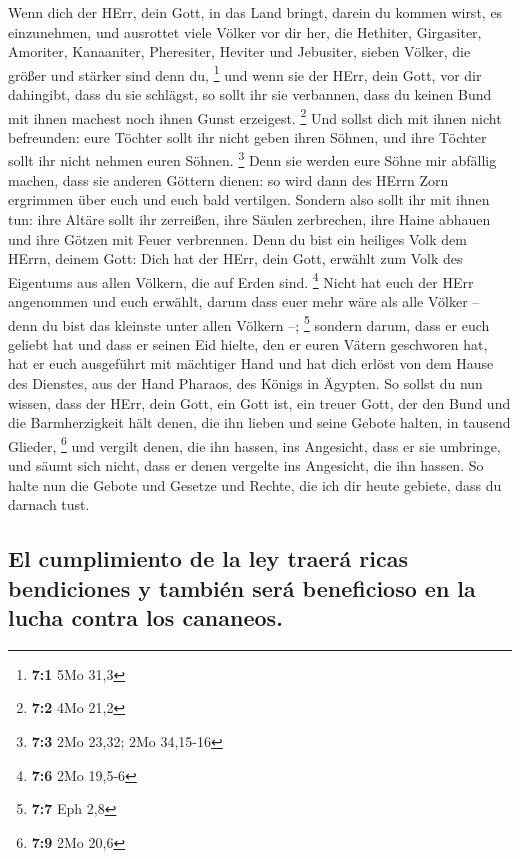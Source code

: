  Wenn dich der HErr, dein Gott, in das Land bringt, darein
du kommen wirst, es einzunehmen, und ausrottet viele Völker vor dir her,
die Hethiter, Girgasiter, Amoriter, Kanaaniter, Pheresiter, Heviter und
Jebusiter, sieben Völker, die größer und stärker sind denn du,
\footnote{\textbf{7:1} 5Mo 31,3}  und wenn sie der HErr,
dein Gott, vor dir dahingibt, dass du sie schlägst, so sollt ihr sie
verbannen, dass du keinen Bund mit ihnen machest noch ihnen Gunst
erzeigest. \footnote{\textbf{7:2} 4Mo 21,2}  Und sollst
dich mit ihnen nicht befreunden: eure Töchter sollt ihr nicht geben
ihren Söhnen, und ihre Töchter sollt ihr nicht nehmen euren Söhnen.
\footnote{\textbf{7:3} 2Mo 23,32; 2Mo 34,15-16}  Denn sie
werden eure Söhne mir abfällig machen, dass sie anderen Göttern dienen:
so wird dann des HErrn Zorn ergrimmen über euch und euch bald vertilgen.
 Sondern also sollt ihr mit ihnen tun: ihre Altäre sollt
ihr zerreißen, ihre Säulen zerbrechen, ihre Haine abhauen und ihre
Götzen mit Feuer verbrennen.  Denn du bist ein heiliges
Volk dem HErrn, deinem Gott: Dich hat der HErr, dein Gott, erwählt zum
Volk des Eigentums aus allen Völkern, die auf Erden sind. \footnote{\textbf{7:6}
  2Mo 19,5-6}  Nicht hat euch der HErr angenommen und euch
erwählt, darum dass euer mehr wäre als alle Völker -- denn du bist das
kleinste unter allen Völkern --; \footnote{\textbf{7:7} Eph 2,8}
 sondern darum, dass er euch geliebt hat und dass er
seinen Eid hielte, den er euren Vätern geschworen hat, hat er euch
ausgeführt mit mächtiger Hand und hat dich erlöst von dem Hause des
Dienstes, aus der Hand Pharaos, des Königs in Ägypten.  So
sollst du nun wissen, dass der HErr, dein Gott, ein Gott ist, ein treuer
Gott, der den Bund und die Barmherzigkeit hält denen, die ihn lieben und
seine Gebote halten, in tausend Glieder, \footnote{\textbf{7:9} 2Mo 20,6}
 und vergilt denen, die ihn hassen, ins Angesicht, dass
er sie umbringe, und säumt sich nicht, dass er denen vergelte ins
Angesicht, die ihn hassen.  So halte nun die Gebote und
Gesetze und Rechte, die ich dir heute gebiete, dass du darnach tust.

\hypertarget{el-cumplimiento-de-la-ley-traeruxe1-ricas-bendiciones-y-tambiuxe9n-seruxe1-beneficioso-en-la-lucha-contra-los-cananeos.}{%
\subsection{El cumplimiento de la ley traerá ricas bendiciones y también
será beneficioso en la lucha contra los
cananeos.}\label{el-cumplimiento-de-la-ley-traeruxe1-ricas-bendiciones-y-tambiuxe9n-seruxe1-beneficioso-en-la-lucha-contra-los-cananeos.}}

